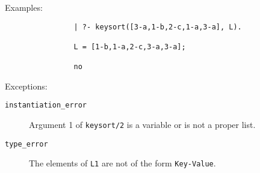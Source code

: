 \begin{description}
    Examples:
    {\footnotesize
     \begin{verbatim}
                | ?- keysort([3-a,1-b,2-c,1-a,3-a], L).

                L = [1-b,1-a,2-c,3-a,3-a];

                no
     \end{verbatim}}
    Exceptions:
    \begin{description}
    \item[{\tt instantiation\_error}]
	Argument 1 of {\tt keysort/2} is a variable or is not a proper list.
    \item[{\tt type\_error}]
	The elements of {\tt L1} are not of the form \verb'Key-Value'.
    \end{description}
\end{description}






